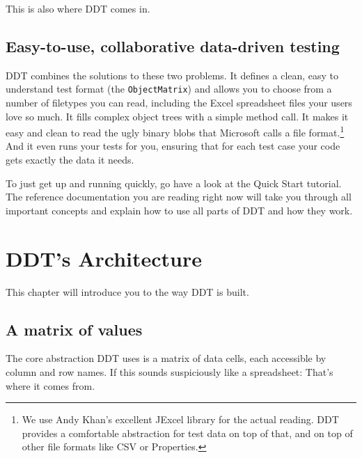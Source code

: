 This is also where \textsf{DDT} comes in.


\subsection{Easy-to-use, collaborative data-driven testing} %
\label{sub:easy_to_use_collaborative_data_driven_testing}

\textsf{DDT} combines the solutions to these two problems. It defines a clean, easy to understand test format (the \texttt{ObjectMatrix}) and allows you to choose from a number of filetypes you can read, including the \textsf{Excel} spreadsheet files your users love so much. It fills complex object trees with a simple method call. It makes it easy and clean to read the ugly binary blobs that Microsoft calls a file format.\footnote{We use Andy Khan's excellent \textsf{JExcel} library for the actual reading. \textsf{DDT} provides a comfortable abstraction for test data on top of that, and on top of other file formats like CSV or Properties.} And it even runs your tests for you, ensuring that for each test case your code gets exactly the data it needs.

To just get up and running quickly, go have a look at the Quick Start tutorial. The reference documentation you are reading right now will take you through all important concepts and explain how to use all parts of \textsf{DDT} and how they work.



\section{DDT's Architecture} %
\label{sec:ddt_s_architecture}

This chapter will introduce you to the way \textsf{DDT} is built.

\subsection{A matrix of values} %
\label{sub:a_matrix_of_values}

The core abstraction \textsf{DDT} uses is a matrix of data cells, each accessible by column and row names. If this sounds suspiciously like a spreadsheet: That's where it comes from. 


